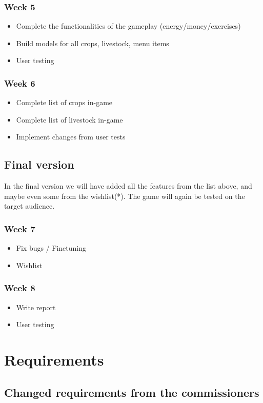 \documentclass[a4paper,11pt,notitlepage]{report}
\begin{document}
\subsubsection{Week 5}
\begin{itemize}
\item Complete the functionalities of the gameplay (energy/money/exercises)
\item Build models for all crops, livestock, menu items
\item User testing
\end{itemize}

\subsubsection{Week 6}
\begin{itemize}
\item Complete list of crops in-game
\item Complete list of livestock in-game
\item Implement changes from user tests
\end{itemize}
\subsection{Final version}
In the final version we will have added all the features from the list above, and maybe even some from the wishlist(*). The game will again be tested on the target audience.
\subsubsection{Week 7}
\begin{itemize}
\item Fix bugs / Finetuning
\item Wishlist
\end{itemize}
\subsubsection{Week 8}
\begin{itemize}
\item Write report
\item User testing
\end{itemize}

\section{Requirements}
\subsection{Changed requirements from the commissioners}
\end{document}
